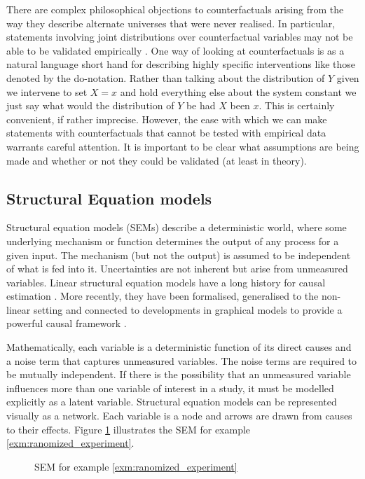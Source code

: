 \documentclass[11pt,a4paper,oneside]{book}
\theoremstyle{plain}
\theoremstyle{definition}
\let\epsilon\varepsilon
\begin{document}
There are complex philosophical objections to counterfactuals arising from the way they describe alternate universes that were never realised. In particular, statements involving joint distributions over counterfactual variables may not be able to be validated empirically \citet{Dawid2000}. One way of looking at counterfactuals is as a natural language short hand for describing highly specific interventions like those denoted by the do-notation. Rather than talking about the distribution of $Y$ given we intervene to set $X=x$ and hold everything else about the system constant we just say what would the distribution of $Y$ be had $X$ been $x$. This is certainly convenient, if rather imprecise. However, the ease with which we can make statements with counterfactuals that cannot be tested with empirical data warrants careful attention. It is important to be clear what assumptions are being made and whether or not they could be validated (at least in theory). 

\subsection{Structural Equation models}
\label{sec:SEM}

Structural equation models (SEMs) describe a deterministic world, where some underlying mechanism or function determines the output of any process for a given input. The mechanism (but not the output) is assumed to be independent of what is fed into it. Uncertainties are not inherent but arise from unmeasured variables. Linear structural equation models have a long history for causal estimation \cite {Wright1921,Haavelmo1943}. More recently, they have been formalised, generalised to the non-linear setting and connected to developments in graphical models to provide a powerful causal framework \citep{Pearl2000}.

Mathematically, each variable is a deterministic function of its direct causes and a noise term that captures unmeasured variables. The noise terms are required to be mutually independent. If there is the possibility that an unmeasured variable influences more than one variable of interest in a study, it must be modelled explicitly as a latent variable. Structural equation models can be represented visually as a network. Each variable is a node and arrows are drawn from causes to their effects. Figure \ref{fig:sem_randomized_treatment} illustrates the SEM for example \ref{exm:ranomized_experiment}.

\begin{figure}[h]
\centering
{}
\caption{SEM for example \ref{exm:ranomized_experiment}}
\label{fig:sem_randomized_treatment}
\end{figure}
\end{document}

